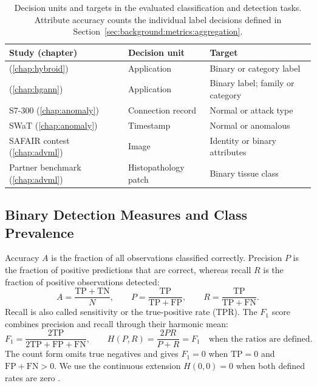 \begin{table}[tbp]
  \centering
  \caption[Decision units and prediction targets]{Decision units and targets in the evaluated classification and detection tasks. Attribute
  accuracy counts the individual label decisions defined in
  Section~\ref{sec:background:metrics:aggregation}.}
  \label{tab:background:tasks}
  \small
  \begin{tabularx}{\textwidth}{@{}>{\raggedright\arraybackslash}p{}
    >{\raggedright\arraybackslash}p{}
    >{\raggedright\arraybackslash}X@{}}
    \toprule
    Study (chapter) & Decision unit & Target \\
    \midrule
    \hybroid{} (\ref{chap:hybroid}) & Application & Binary or category label \\
    \hgann{} (\ref{chap:hgann}) & Application & Binary label; family or category \\
    S7-300 (\ref{chap:anomaly}) & Connection record & Normal or attack type \\
    SWaT (\ref{chap:anomaly}) & Timestamp & Normal or anomalous \\
    SAFAIR contest (\ref{chap:advml}) & Image & Identity or binary attributes \\
    Partner benchmark (\ref{chap:advml}) & Histopathology patch & Binary tissue class \\
    \bottomrule
  \end{tabularx}
\end{table}

\subsection{Binary Detection Measures and Class Prevalence}
\label{sec:background:metrics:binary}

Accuracy $A$ is the fraction of all observations classified correctly. Precision $P$ is the
fraction of positive predictions that are correct, whereas recall $R$ is the fraction of
positive observations detected:
\begin{equation}
  A=\frac{\mathrm{TP}+\mathrm{TN}}{N},\qquad
  P=\frac{\mathrm{TP}}{\mathrm{TP}+\mathrm{FP}},\qquad
  R=\frac{\mathrm{TP}}{\mathrm{TP}+\mathrm{FN}}.
  \label{eq:background:accuracy-precision-recall}
\end{equation}
Recall is also called sensitivity or the true-positive rate (TPR). The $F_1$ score combines
precision and recall through their harmonic mean:
\begin{equation}
  F_1=\frac{2\mathrm{TP}}{2\mathrm{TP}+\mathrm{FP}+\mathrm{FN}},\qquad
  H(P,R)=\frac{2PR}{P+R}=F_1
  \quad\text{when the ratios are defined}.
  \label{eq:background:f1}
\end{equation}
The count form omits true negatives and gives $F_1=0$ when $\mathrm{TP}=0$ and
$\mathrm{FP}+\mathrm{FN}>0$. We use the continuous extension $H(0,0)=0$ when both defined rates
are zero
\cite{fawcett2006roc,sorbo2024navigating}.


